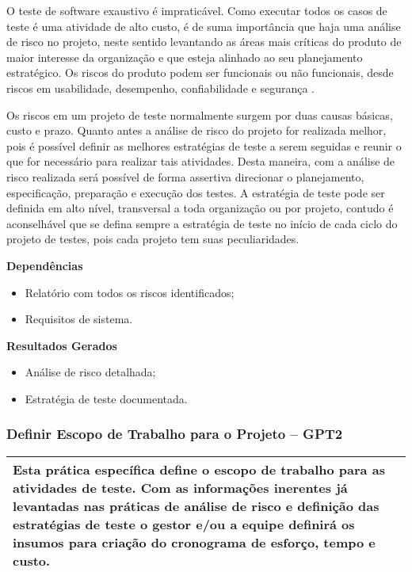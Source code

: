 O teste de software exaustivo é impraticável. Como executar todos os casos de teste é uma atividade de alto custo, é de suma importância que haja uma análise de risco no projeto, neste sentido levantando as áreas mais críticas do produto de maior interesse da organização e que esteja alinhado ao seu planejamento estratégico. Os riscos do produto podem ser funcionais ou não funcionais, desde riscos em usabilidade, desempenho, confiabilidade e segurança \cite{GuiaMPTbr}. 

Os riscos em um projeto de teste normalmente surgem por duas causas básicas, custo e prazo. Quanto antes a análise de risco do projeto for realizada melhor, pois é possível definir as melhores estratégias de teste a serem seguidas e reunir o que for necessário para realizar tais atividades. Desta maneira, com a análise de risco realizada será possível de forma assertiva direcionar o planejamento, especificação, preparação e execução dos testes. A estratégia de teste pode ser definida em alto nível, transversal a toda organização ou por projeto, contudo é aconselhável que se defina sempre a estratégia de teste no início de cada ciclo do projeto de testes, pois cada projeto tem suas peculiaridades.

\textbf{Dependências}


\begin{itemize}
\item Relatório com todos os riscos identificados;
\item Requisitos de sistema.
\end{itemize}

\textbf{Resultados Gerados}
\begin{itemize}
\item Análise de risco detalhada;
\item Estratégia de teste documentada.
\end{itemize}


\subsubsection{Definir Escopo de Trabalho para o Projeto – GPT2}
\label{sec:gpt2}

\begin{table}[!ht]
\centering
\begin{tabular}{|p{130mm}|}
\hline
Esta prática específica define o escopo de trabalho para as atividades de teste. Com as informações inerentes já levantadas nas práticas de análise de risco e definição das estratégias de teste o gestor e/ou a equipe definirá os insumos para criação do cronograma de esforço, tempo e custo. \\ 
\hline
\end{tabular}
\end{table}

